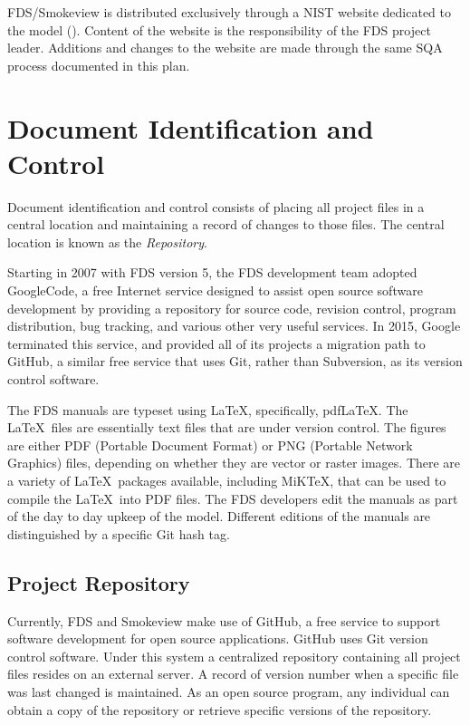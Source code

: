 \documentclass[11pt]{book}
\begin{document}
FDS/Smokeview is distributed exclusively through a NIST website dedicated to the model \linebreak (\href{https://pages.nist.gov/fds/} {}).  Content of the website is the responsibility of the FDS project leader. Additions and changes to the website are made through the same SQA process documented in this plan.


\section{Document Identification and Control}

Document identification and control consists of placing all project files in a central location and maintaining a record of changes to those files.
The central location is known as the {\em Repository}.

Starting in 2007 with FDS version 5, the FDS development team adopted GoogleCode, a free Internet service designed to assist open source software development by providing a repository for source code, revision control, program distribution, bug tracking, and various other very useful services. In 2015, Google terminated this service, and provided all of its projects a migration path to GitHub, a similar free service that uses Git, rather than Subversion, as its version control software.

The FDS manuals are typeset using \LaTeX, specifically, pdf\LaTeX. The \LaTeX\ files are essentially text files that are under version control. The figures are either PDF (Portable Document Format) or PNG (Portable Network Graphics) files, depending on whether they are vector or raster images. There are a variety of \LaTeX\ packages available, including MiKTeX, that can be used to compile the \LaTeX\ into PDF files. The FDS developers edit the manuals as part of the day to day upkeep of the model. Different editions of the manuals are distinguished by a specific Git hash tag.


\subsection{Project Repository}

Currently, FDS and Smokeview make use of GitHub, a free service to support software development for open source applications. GitHub uses Git version control software. Under this system a centralized repository containing all project files resides on an external server.   A record of version number when a specific file was last changed is maintained. As an open source program, any individual can obtain a copy of the repository or retrieve specific versions of the repository.
\end{document}
